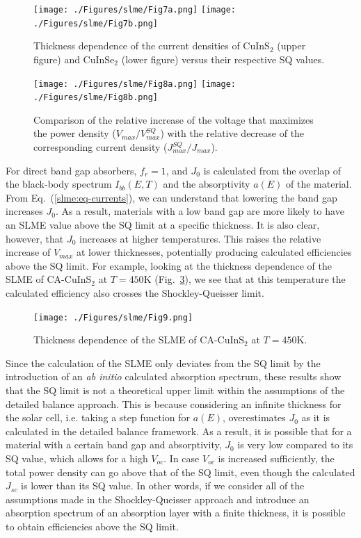 \begin{refsection}
\begin{figure}[h] 
	\centering 
	\texttt{[image: ./Figures/slme/Fig7a.png]} 
	\texttt{[image: ./Figures/slme/Fig7b.png]}	 
	\caption{Thickness dependence of the current densities of CuInS$_2$ (upper 
figure) and CuInSe$_2$ (lower figure) versus their respective SQ values.} 
	\label{slme:fig-J_L} 
\end{figure} 
 
\begin{figure}[h] 
	\centering 
		\texttt{[image: ./Figures/slme/Fig8a.png]} 
		\texttt{[image: ./Figures/slme/Fig8b.png]} 
	\caption{Comparison of the relative increase of the voltage that maximizes 
the power density ($V_{max}/V_{max}^{SQ}$) with the relative decrease of the 
corresponding current density ($J_{max}^{SQ}/J_{max}$).} 
	\label{slme:fig-VJcomp} 
\end{figure} 
 
For direct band gap absorbers, $f_r = 1$, and $J_0$ is calculated from the 
overlap of the black-body spectrum $I_{bb}(E,T)$ and the absorptivity $a(E)$ 
of the material. From Eq.~(\ref{slme:eq-currents}), we can understand that 
lowering the band gap increases $J_0$. As a result, materials with a low band 
gap are more likely to have an SLME value above the SQ limit at a specific 
thickness. It is also clear, however, that $J_0$ increases at higher 
temperatures. This raises the relative increase of $V_{max}$ at lower 
thicknesses, potentially producing calculated efficiencies above the SQ limit. 
For example, looking at the thickness dependence of the SLME of CA-CuInS$_2$ 
at $T=450\si{\kelvin}$ (Fig.~\ref{slme:fig-SLME_highT}), we see that at this 
temperature the calculated efficiency also crosses the Shockley-Queisser 
limit.  
 
\begin{figure}[h] 
	\centering 
		\texttt{[image: ./Figures/slme/Fig9.png]} 
	\caption{Thickness dependence of the SLME of CA-CuInS$_2$ at $T = 
450$\si{\kelvin}.} 
	\label{slme:fig-SLME_highT} 
\end{figure} 
 
Since the calculation of the SLME only deviates from the SQ limit by the 
introduction of an \textit{ab initio} calculated absorption spectrum, these 
results show that the SQ limit is not a theoretical upper limit within the 
assumptions of the detailed balance approach. This is because considering an 
infinite thickness for the solar cell, i.e. taking a step function for $a(E)$, 
overestimates $J_0$ as it is calculated in the detailed balance framework. As 
a result, it is possible that for a material with a certain band gap and 
absorptivity, $J_0$ is very low compared to its SQ value, which allows for a 
high $V_{oc}$. In case $V_{oc}$ is increased sufficiently, the total power 
density can go above that of the SQ limit, even though the calculated $J_{sc}$ 
is lower than its SQ value. In other words, if we consider all of the 
assumptions made in the Shockley-Queisser approach and introduce an absorption 
spectrum of an absorption layer with a finite thickness, it is possible to 
obtain efficiencies above the SQ limit. 
 

\end{refsection}
